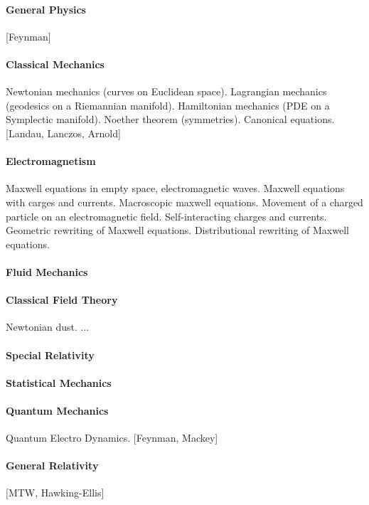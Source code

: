 \paragraph{General Physics}
[Feynman]

\paragraph{Classical Mechanics}
Newtonian mechanics (curves on Euclidean space).
Lagrangian mechanics (geodesics on a Riemannian manifold).
Hamiltonian mechanics (PDE on a Symplectic manifold).
Noether theorem (symmetries).
Canonical equations.
[Landau, Lanczos, Arnold]

\paragraph{Electromagnetism}
Maxwell equations in empty space, electromagnetic waves.
Maxwell equations with carges and currents.
Macroscopic maxwell equations.
Movement of a charged particle on an electromagnetic field.
Self-interacting charges and currents.
Geometric rewriting of Maxwell equations.
Distributional rewriting of Maxwell equations.

\paragraph{Fluid Mechanics}

\paragraph{Classical Field Theory}
Newtonian dust. ...

\paragraph{Special Relativity}

\paragraph{Statistical Mechanics}

\paragraph{Quantum Mechanics}
Quantum Electro Dynamics.
[Feynman, Mackey]

\paragraph{General Relativity}
[MTW, Hawking-Ellis]

